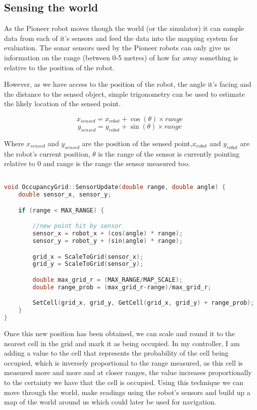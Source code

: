 \documentclass{article}
\begin{document}
\subsection{Sensing the world}
As the Pioneer robot moves though the world (or the simulator) it can sample data from each of it's sensors and feed the data into the mapping system for evaluation. The sonar sensors used by the Pioneer robots can only give us information on the range (between 0-5 metres) of how far away something is relative to the position of the robot.

However, as we have access to the position of the robot, the angle it's facing and the distance to the sensed object, simple trigonometry can be used to estimate the likely location of the sensed point.

\[ x_{sensed} = x_{robot} + \cos (\theta) \times range \]
\[ y_{sensed} = y_{robot} + \sin (\theta) \times range \]

Where $x_{sensed}$ and $y_{sensed}$ are the position of the sensed point,$x_{robot}$ and $y_{robot}$ are the robot's current position, $\theta$ is the range of the sensor is currently pointing relative to 0 and range is the range the sensor measured too.

\begin{center}
	\begin{lstlisting}[language=c++, showstringspaces=false, caption={C++ code used for calculating the new point given the current position, angle and range}]

void OccupancyGrid::SensorUpdate(double range, double angle) {
	double sensor_x, sensor_y;

	if (range < MAX_RANGE) {

		//new point hit by sensor
		sensor_x = robot_x + (cos(angle) * range);
		sensor_y = robot_y + (sin(angle) * range);

		grid_x = ScaleToGrid(sensor_x);
		grid_y = ScaleToGrid(sensor_y);

		double max_grid_r = (MAX_RANGE/MAP_SCALE);
		double range_prob = (max_grid_r-range)/max_grid_r;

		SetCell(grid_x, grid_y, GetCell(grid_x, grid_y) + range_prob);
	}
}

	\end{lstlisting}
\end{center}

Once this new position has been obtained, we can scale and round it to the nearest cell in the grid and mark it as being occupied. In my controller, I am adding a value to the cell that represents the probability of the cell being occupied, which is inversely proportional to the range measured, as this cell is measured more and more and at closer ranges, the value increases proportionally to the certainty we have that the cell is occupied. Using this technique we can move through the world, make readings using the robot's sensors and build up a map of the world around us which could later be used for navigation.
\end{document}
